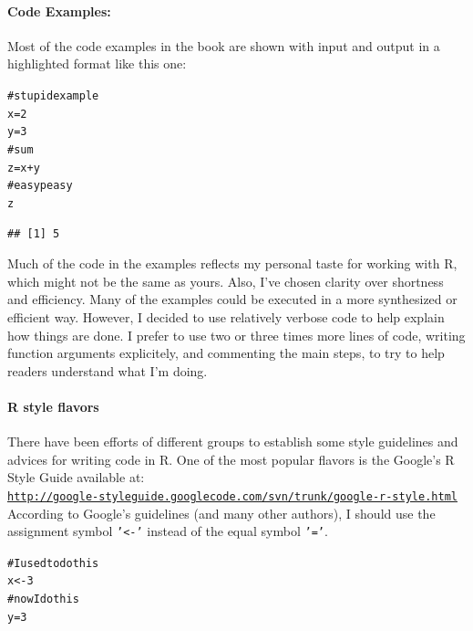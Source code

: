 \documentclass[12pt]{book}\usepackage{graphicx, color}
\makeatletter
\newcommand{\hlcomment}[1]{\textcolor[rgb]{0.180392156862745,0.6,0.341176470588235}{#1}}%
\newenvironment{kframe}{%
 \def\at@end@of@kframe{}%
 \ifinner\ifhmode%
  \def\at@end@of@kframe{\end{minipage}}%
  \begin{minipage}{\columnwidth}%
 \fi\fi%
 \def\FrameCommand##1{\hskip\@totalleftmargin \hskip-\fboxsep
 \colorbox{shadecolor}{##1}\hskip-\fboxsep
     \hskip-\linewidth \hskip-\@totalleftmargin \hskip\columnwidth}%
 \MakeFramed {\advance\hsize-\width
   \@totalleftmargin\z@ \linewidth\hsize
   \@setminipage}}%
 {\par\unskip\endMakeFramed%
 \at@end@of@kframe}
\newenvironment{knitrout}{}{} %
\newcommand{\code}[1]{\texttt{#1}}
\makeatother
\begin{document}
\paragraph{Code Examples:} Most of the code examples in the book are shown with input and output in a highlighted format like this one:
\begin{knitrout}
\color{fgcolor}\begin{kframe}
\begin{alltt}
\hlcomment{# stupid example}
x = 2
y = 3
\hlcomment{# sum}
z = x + y
\hlcomment{# easy peasy}
z
\end{alltt}
\begin{verbatim}
## [1] 5
\end{verbatim}
\end{kframe}
\end{knitrout}

Much of the code in the examples reflects my personal taste for working with R, which might not be the same as yours. Also, I've chosen clarity over shortness and efficiency. Many of the examples could be executed in a more synthesized or efficient way. However, I decided to use relatively verbose code to help explain how things are done. I prefer to use two or three times more lines of code, writing function arguments explicitely, and commenting the main steps, to try to help readers understand what I'm doing.


\paragraph{R style flavors}
There have been efforts of different groups to establish some style guidelines and advices for writing code in R. One of the most popular flavors is the Google's R Style Guide available at: \\
\texttt{\href{http://google-styleguide.googlecode.com/svn/trunk/google-r-style.html}{http://google-styleguide.googlecode.com/svn/trunk/google-r-style.html}} \\
According to Google's guidelines (and many other authors), I should use the assignment symbol \code{'<-'} instead of the equal symbol \code{'='}. 
\begin{knitrout}
\color{fgcolor}\begin{kframe}
\begin{alltt}
\hlcomment{# I used to do this}
x <- 3
\hlcomment{# now I do this}
y = 3
\end{alltt}
\end{kframe}
\end{knitrout}
\end{document}
